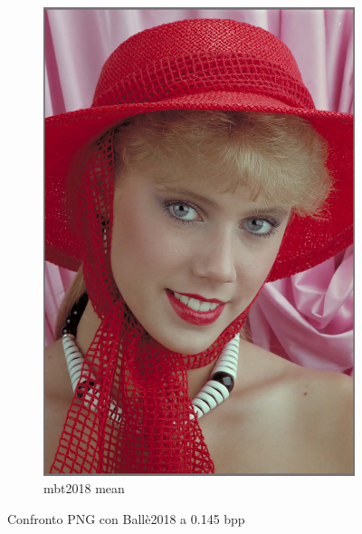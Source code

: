 \begin{figure}[t!]
\begin{subfigure}[]{0.25\textwidth}
        \includegraphics[width=\textwidth]{Immagini/IMAGES/mbt2018_mean_3_IMG0004.pdf}
        \caption{mbt2018 mean}
        \label{fig:CompressedMbt2018Mean}
    \end{subfigure}
    \caption{Confronto PNG con Ballè2018 a 0.145 bpp}
    \label{fig:CompressionMbt2018}
\end{figure}

